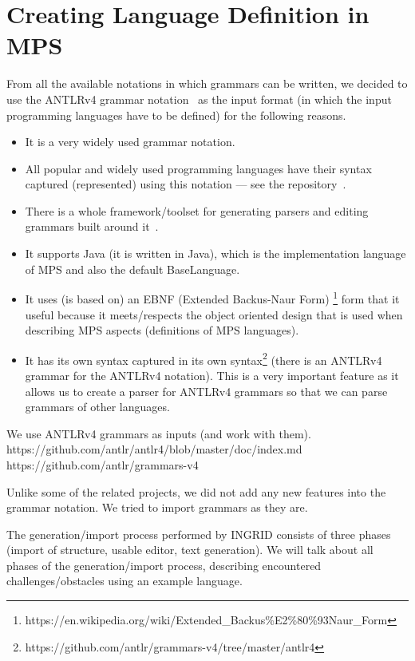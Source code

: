 
\section{Creating Language Definition in MPS}
\label{sect:LANGDEF}

From all the available notations in which grammars can be written, we decided to use the ANTLRv4 grammar notation~\cite{ANTLR4reference} as the input format (in which the input programming languages have to be defined) for the following reasons.
\begin{itemize}
	\item It is a very widely used grammar notation.
	\item All popular and widely used programming languages have their syntax captured (represented) using this notation --- see the repository~\cite{ref:ANTLR4grammars}.
	\item There is a whole framework/toolset for generating parsers and editing grammars built around it~\cite{ref:ANTLR4}.
	\item It supports Java (it is written in Java), which is the implementation language of MPS and also the default BaseLanguage.
	\item It uses (is based on) an EBNF (Extended Backus-Naur Form) \footnote{https://en.wikipedia.org/wiki/Extended{\_}Backus\%E2\%80\%93Naur{\_}Form} form that it useful because it meets/respects the object oriented design that is used when describing MPS aspects (definitions of MPS languages).
	\item It has its own syntax captured in its own syntax\footnote{https://github.com/antlr/grammars-v4/tree/master/antlr4} (there is an ANTLRv4 grammar for the ANTLRv4 notation). This is a very important feature as it allows us to create a parser for ANTLRv4 grammars so that we can parse grammars of other languages.
\end{itemize}

We use ANTLRv4 grammars as inputs (and work with them).
	https://github.com/antlr/antlr4/blob/master/doc/index.md
	https://github.com/antlr/grammars-v4

Unlike some of the related projects, we did not add any new features into the grammar notation.
We tried to import grammars as they are.

The generation/import process performed by INGRID consists of three phases (import of structure, usable editor, text generation).
We will talk about all phases of the generation/import process, describing encountered challenges/obstacles using an example language.

